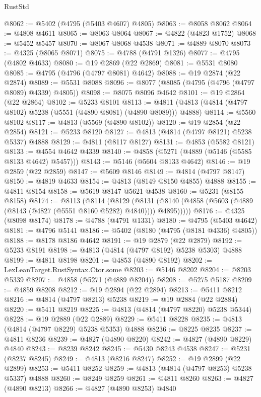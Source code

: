 \begin{lexlean}{RustStd}
\begin{coremodule}
@8062 := @5402 (@4795 (@5403 @4607) @4805)
@8063 := @8058 @8062
@8064 := @4808 @4611
@8065 := @8063 @8064
@8067 := @4822 (@4823 @1752)
@8068 := @5452 @5457
@8070 := @8067 @8068 @4538
@8071 := @4889 @8070
@8073 := @4325 (@8065 @8071)
@8075 := @4788 (@4791 @1326)
@8077 := @4795 (@4802 @4633)
@8080 := @19 @2869 (@22 @2869)
@8081 := @5531 @8080
@8085 := @4795 (@4796 (@4797 @8081) @4642)
@8088 := @19 @2874 (@22 @2874)
@8089 := @5531 @8088
@8096 := @8077 (@8085 (@4795 (@4796 (@4797 @8089) @4339) @4805))
@8098 := @8075 @8096 @4642
@8101 := @19 @2864 (@22 @2864)
@8102 := @5233 @8101
@8113 := @4811 (@4813 (@4814 (@4797 @8102) @5238 (@5551 (@4890 @8081) (@4890 @8089))) @4888)
@8114 := @5560 @8102
@8117 := @4813 (@5569 (@4890 @8102))
@8120 := @19 @2854 (@22 @2854)
@8121 := @5233 @8120
@8127 := @4813 (@4814 (@4797 @8121) @5238 @5337) @4888
@8129 := @4811 (@8117 @8127)
@8131 := @4853 (@5582 @8121)
@8133 := @4554 @4642 @4339
@8140 := @4858 (@5271 (@4889 (@5146 (@5585 @8133 @4642) @5457)))
@8143 := @5146 (@5604 @8133 @4642)
@8146 := @19 @2859 (@22 @2859)
@8147 := @5609 @8146
@8149 := @4814 (@4797 @8147)
@8150 := @4819 @4633
@8154 := @4813 (@8149 @8150 @4855) @4888
@8155 := @4811 @8154
@8158 := @5619 @8147 @5621 @4538
@8160 := @5231 (@8155 @8158)
@8174 := @8113
    (@8114
      (@8129
        (@8131 (@8140 (@4858 (@5603 (@4889 (@8143 (@4827 (@5551 @8160 @5282) @4840)))) @4895)))))
@8176 := @4325 (@8098 @8174)
@8178 := @4788 (@4791 @1331)
@8180 := @4795 (@5403 @4642)
@8181 := @4796 @5141
@8186 := @5402 (@8180 (@4795 (@8181 @4336) @4805))
@8188 := @8178 @8186 @4642
@8191 := @19 @2879 (@22 @2879)
@8192 := @5233 @8191
@8198 := @4813 (@4814 (@4797 @8192) @5238 @5303) @4888
@8199 := @4811 @8198
@8201 := @4853 (@4890 @8192)
@8202 := LexLeanTarget.RustSyntax.Ctor.some
@8203 := @5146 @8202
@8204 := @8203 @5339
@8207 := @4858 (@5271 (@4889 @8204))
@8208 := @5275 @5187
@8209 := @4859 @8208
@8212 := @19 @2894 (@22 @2894)
@8213 := @5411 @8212
@8216 := @4814 (@4797 @8213) @5238
@8219 := @19 @2884 (@22 @2884)
@8220 := @5411 @8219
@8225 := @4813 (@4814 (@4797 @8220) @5238 @5344)
@8228 := @19 @2889 (@22 @2889)
@8229 := @5411 @8228
@8235 := @4813 (@4814 (@4797 @8229) @5238 @5353) @4888
@8236 := @8225 @8235
@8237 := @4811 @8236
@8239 := @4827 (@4890 @8220)
@8242 := @4827 (@4890 @8229) @4840
@8243 := @8239 @8242
@8245 := @5430 @8243 @4538
@8247 := @5231 (@8237 @8245)
@8249 := @4813 (@8216 @8247)
@8252 := @19 @2899 (@22 @2899)
@8253 := @5411 @8252
@8259 := @4813 (@4814 (@4797 @8253) @5238 @5337) @4888
@8260 := @8249 @8259
@8261 := @4811 @8260
@8263 := @4827 (@4890 @8213)
@8266 := @4827 (@4890 @8253) @4840

\end{coremodule}
\end{lexlean}
